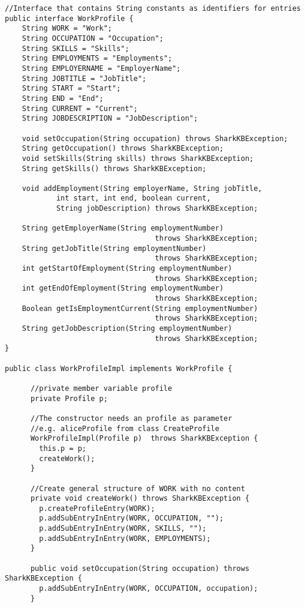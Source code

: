 \documentclass[12pt]{article}
\begin{document}
\begin{verbatim}
//Interface that contains String constants as identifiers for entries
public interface WorkProfile {
    String WORK = "Work";
    String OCCUPATION = "Occupation";
    String SKILLS = "Skills";
    String EMPLOYMENTS = "Employments";
    String EMPLOYERNAME = "EmployerName";
    String JOBTITLE = "JobTitle";
    String START = "Start";
    String END = "End";
    String CURRENT = "Current";
    String JOBDESCRIPTION = "JobDescription";

    void setOccupation(String occupation) throws SharkKBException;
    String getOccupation() throws SharkKBException;
    void setSkills(String skills) throws SharkKBException;
    String getSkills() throws SharkKBException;
    
    void addEmployment(String employerName, String jobTitle,
            int start, int end, boolean current,
            String jobDescription) throws SharkKBException;

    String getEmployerName(String employmentNumber) 
                                   throws SharkKBException;
    String getJobTitle(String employmentNumber) 
                                   throws SharkKBException;
    int getStartOfEmployment(String employmentNumber) 
                                   throws SharkKBException;
    int getEndOfEmployment(String employmentNumber) 
                                   throws SharkKBException;
    Boolean getIsEmploymentCurrent(String employmentNumber) 
                                   throws SharkKBException;
    String getJobDescription(String employmentNumber) 
                                   throws SharkKBException;
}

public class WorkProfileImpl implements WorkProfile {
	
      //private member variable profile
      private Profile p;

      //The constructor needs an profile as parameter
      //e.g. aliceProfile from class CreateProfile
      WorkProfileImpl(Profile p)  throws SharkKBException {
        this.p = p;
        createWork();
      }

      //Create general structure of WORK with no content
      private void createWork() throws SharkKBException {
        p.createProfileEntry(WORK);
        p.addSubEntryInEntry(WORK, OCCUPATION, "");
        p.addSubEntryInEntry(WORK, SKILLS, "");
        p.addSubEntryInEntry(WORK, EMPLOYMENTS);
      }

      public void setOccupation(String occupation) throws SharkKBException {
        p.addSubEntryInEntry(WORK, OCCUPATION, occupation);
      }


\end{verbatim}
\end{document}
